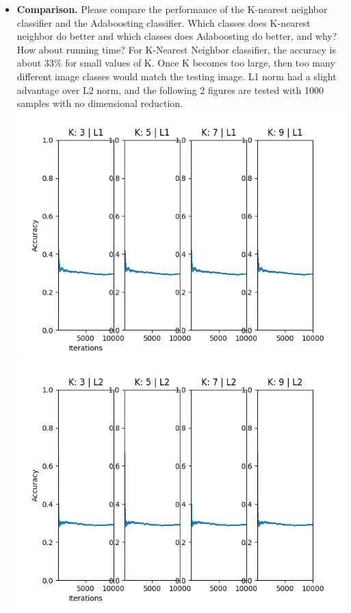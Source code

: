 \documentclass[11pt]{article}
\begin{document}
    \begin{itemize}
        \item \textbf{Comparison.} Please compare the performance of the K-nearest neighbor classifier and the
        Adaboosting classifier. Which classes does K-nearest neighbor do better and which classes does Adaboosting do
        better, and
        why? How about running time?
        For K-Nearest Neighbor classifier, the accuracy is about 33\% for small values of K. Once K becomes too
        large, then too many different image classes would match the testing image. L1 norm had a slight advantage
        over L2 norm, and the following 2 figures are tested with 1000 samples with no dimensional reduction.\newline
        \includegraphics[width=\textwidth]{Output Pictures/Nearest Neighbors L1}
        \includegraphics[width=\textwidth]{Output Pictures/Nearest Neighbors L2}

\end{itemize}
\end{document}
